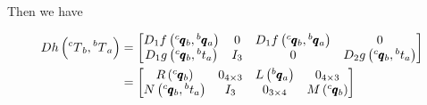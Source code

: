 \documentclass{article}
\begin{document}
Then we have

\begin{align*}
    Dh\left(\prescript{c}{}{T}_b, \prescript{b}{}{T}_a \right) &= \begin{bmatrix}
        D_1 f\left(\prescript{c}{}{\pmb{q}}_b, \prescript{b}{}{\pmb{q}}_a \right)& 0 &  D_1 f\left(\prescript{c}{}{\pmb{q}}_b, \prescript{b}{}{\pmb{q}}_a \right) & 0 \\
        D_1 g\left( \prescript{c}{}{\pmb{q}}_b, \prescript{b}{}{t}_a\right) & I_3 & 0 & D_2 g\left( \prescript{c}{}{\pmb{q}}_b, \prescript{b}{}{t}_a\right)
    \end{bmatrix} \\
    &= \begin{bmatrix}
        R\left( \prescript{c}{}{\pmb{q}}_b \right) & 0_{4 \times 3} & L\left( \prescript{b}{}{\pmb{q}}_a \right) & 0_{4 \times 3} \\
        N\left( \prescript{c}{}{\pmb{q}}_b, \prescript{b}{}{t}_a \right) & I_3 & 0_{3 \times 4} & M\left( \prescript{c}{}{\pmb{q}}_b \right)
    \end{bmatrix}
\end{align*}
\end{document}

